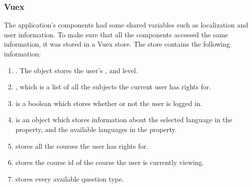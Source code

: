 \subsubsection{Vuex}
The application's components had some shared variables such as localization and user information. To make sure that all the components accessed the same information, it was stored in a Vuex store. The store contains the following information:
\begin{enumerate}
	\item {}. The  object stores the user's ,  and  level.
	\item {}, which is a list of all the subjects the current user has rights for.
	\item {} is a boolean which stores whether or not the user is logged in.
	\item {} is an object which stores information about the selected language in the  property, and the available languages in the  property.
	\item {} stores all the courses the user has rights for.
	\item {} stores the course id of the course the user is currently viewing.
	\item {} stores every available question type.
\end{enumerate}
